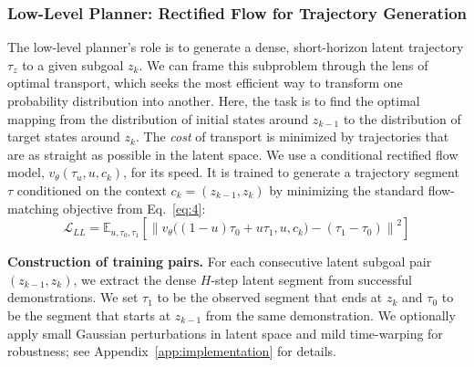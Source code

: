 \documentclass{article} %
\begin{document}
\subsubsection{Low-Level Planner: Rectified Flow for Trajectory Generation}
\vspace{-5pt}
The low-level planner's role is to generate a dense, short-horizon latent trajectory $\tau_z$ to a given subgoal $z_k$. We can frame this subproblem through the lens of optimal transport, which seeks the most efficient way to transform one probability distribution into another. Here, the task is to find the optimal mapping from the distribution of initial states around $z_{k-1}$ to the distribution of target states around $z_k$. The \textit{cost} of transport is minimized by trajectories that are as straight as possible in the latent space. We use a conditional rectified flow model, $v_\theta(\tau_u, u, c_k)$, for its speed. It is trained to generate a trajectory segment $\tau$ conditioned on the context $c_k=(z_{k-1}, z_k)$ by minimizing the standard flow-matching objective from Eq.~\ref{eq:4}:
\begin{equation}
    \mathcal{L}_{LL} = \mathbb{E}_{u, \tau_0, \tau_1} \left[ \left\| v_\theta\big((1-u)\tau_0 + u\tau_1, u, c_k\big) - (\tau_1 - \tau_0) \right\|^2 \right]
\end{equation}

\textbf{Construction of training pairs.} For each consecutive latent subgoal pair $(z_{k-1}, z_k)$, we extract the dense $H$-step latent segment from successful demonstrations. We set $\tau_1$ to be the observed segment that ends at $z_k$ and $\tau_0$ to be the segment that starts at $z_{k-1}$ from the same demonstration. We optionally apply small Gaussian perturbations in latent space and mild time-warping for robustness; see Appendix~\ref{app:implementation} for details.
\end{document}
